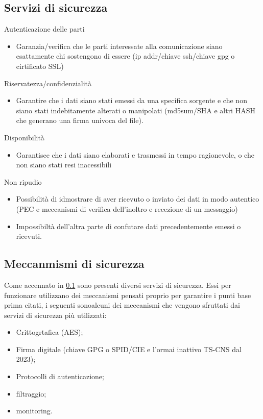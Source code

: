 \documentclass{book}
\begin{document}
\subsection{Servizi di sicurezza}
\label{sec:servdisic}
Autenticazione delle parti
\begin{itemize}
\item Garanzia/verifica che le parti interessate alla comunicazione siano esattamente chi sostengono di essere
  (ip addr/chiave ssh/chiave gpg o cirtificato SSL)
\end{itemize}
Riservatezza/confidenzialità
\begin{itemize}
\item Garantire che i dati siano stati emessi da una specifica sorgente e che non siano stati indebitamente
  alterati o manipolati (md5sum/SHA e altri HASH che generano una firma univoca del file).
\end{itemize}
Disponibilità
\begin{itemize}
\item Garantisce che i dati siano elaborati e trasmessi in tempo ragionevole, o che non siano stati resi
  inacessibili
\end{itemize}
Non ripudio
\begin{itemize}
\item Possibilità di idmostrare di aver ricevuto o inviato dei dati in modo autentico (PEC e meccanismi di
  verifica dell'inoltro e recezione di un messaggio)
\item Impossibiltà dell'altra parte di confutare dati precedentemente emessi o ricevuti.
\end{itemize}

\subsection{Meccanmismi di sicurezza}
\label{sec:mcsicurezza}

Come accennato in \ref{sec:servdisic} sono presenti diversi servizi di sicurezza. Essi per funzionare utilizzano
dei meccanismi pensati proprio per garantire i punti base prima citati, i seguenti sonoalcuni dei meccanismi
che vengono sfruttati dai servizi di sicurezza più utilizzati:
\begin{itemize}
\item Crittogrtafica (AES);
\item Firma digitale (chiave GPG o SPID/CIE e l'ormai inattivo TS-CNS dal 2023);
\item Protocolli di autenticazione;
\item filtraggio;
\item monitoring.
\end{itemize}
\end{document}
